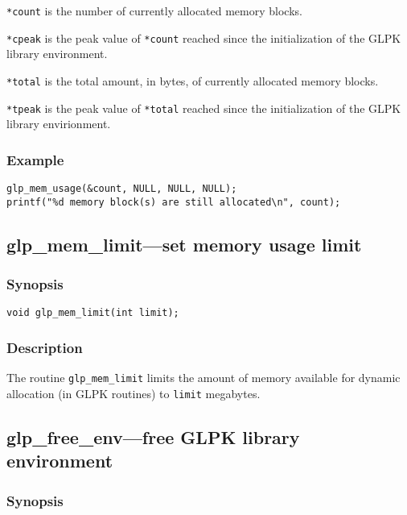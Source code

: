 \verb|*count| is the number of currently allocated memory blocks.

\verb|*cpeak| is the peak value of \verb|*count| reached since the
initialization of the GLPK library environment.

\verb|*total| is the total amount, in bytes, of currently allocated
memory blocks.

\verb|*tpeak| is the peak value of \verb|*total| reached since the
initialization of the GLPK library envirionment.

\subsubsection*{Example}

\begin{verbatim}
glp_mem_usage(&count, NULL, NULL, NULL);
printf("%d memory block(s) are still allocated\n", count);
\end{verbatim}

\subsection{glp\_mem\_limit---set memory usage limit}

\subsubsection*{Synopsis}

\begin{verbatim}
void glp_mem_limit(int limit);
\end{verbatim}

\subsubsection*{Description}

The routine \verb|glp_mem_limit| limits the amount of memory available
for dynamic allocation (in GLPK routines) to \verb|limit| megabytes.

\newpage

\subsection{glp\_free\_env---free GLPK library environment}

\subsubsection*{Synopsis}

